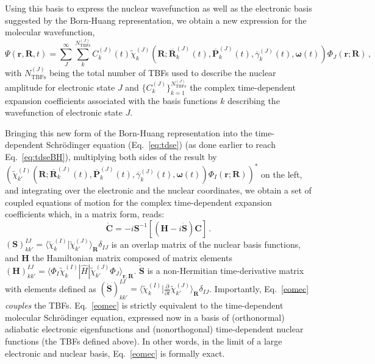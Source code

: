 \documentclass[9pt,bestpractices,pubversion]{livecoms}
\newcommand{\bra}[1]{\langle #1|}
\newcommand{\ket}[1]{|#1\rangle}
\newcommand{\braket}[2]{\langle #1|#2\rangle}
\newcommand{\bs}{\mathbf}
\begin{document}
Using this basis to express the nuclear wavefunction as well as the electronic basis suggested by the Born-Huang representation, we obtain a new expression for the molecular wavefunction,
\begin{equation}
\Psi(\bs r,\bs R,t)=\sum_J^\infty \sum_k^{N_{\text{TBFs}}^{(J)}} C_k^{(J)}(t) \tilde{\chi}_k^{(J)}\left(\bs R;\overline{\bs R}_k^{(J)}(t),\overline{\bs P}_k^{(J)}(t),\overline{\gamma}_k^{(J)}(t),\boldsymbol{\omega}(t)\right) \Phi_J(\bs r;\bs R) \, ,
\label{wfbasis}
\end{equation}
with $N_{\text{TBFs}}^{(J)}$ being the total number of TBFs used to describe the nuclear amplitude for electronic state $J$ and $\{C_k^{(J)}\}_{k=1}^{N_{\text{TBFs}}^{(J)}}$ the complex time-dependent expansion coefficients associated with the basis functions $k$ describing the wavefunction of electronic state $J$.

Bringing this new form of the Born-Huang representation into the time-dependent Schr\"{o}dinger equation (Eq.~\eqref{eq:tdse}) (as done earlier to reach Eq.~\eqref{eq:tdseBH}), multiplying both sides of the result by $\left(\tilde{\chi}_{k'}^{(I)}(\bs R;\overline{\bs R}_k^{(J)}(t),\overline{\bs P}_k^{(J)}(t),\overline{\gamma}_k^{(J)}(t),\boldsymbol{\omega}(t)) \Phi_I(\bs r;\bs R)\right)^*$ on the left, and integrating over the electronic and the nuclear coordinates, we obtain a set of coupled equations of motion for the complex time-dependent expansion coefficients which, in a matrix form, reads:
\begin{equation}
\dot{\bs C}=-i\bs S^{-1}[(\bs H - i \dot{\bs S})\bs C] \, .
\label{eomec}
\end{equation}
$(\bs S)_{kk'}^{IJ}=\braket{\tilde{\chi}_k^{(I)}}{\tilde{\chi}_{k'}^{(J)}}_{\bs R}\delta_{IJ}$ is an overlap matrix of the nuclear basis functions, and $\bs H$ the Hamiltonian matrix composed of matrix elements $(\bs H)_{kk'}^{IJ}=\bra{\Phi_I\tilde{\chi}_k^{(I)}}\hat{H}\ket{\tilde{\chi}_{k'}^{(J)}\Phi_J}_{\bs r,\bs R}$. $\dot{\bs S}$ is a non-Hermitian time-derivative matrix with elements defined as $(\dot{\bs S})_{kk'}^{IJ}=\braket{\tilde{\chi}_k^{(I)}}{\frac{\partial}{\partial t}\tilde{\chi}_{k'}^{(J)}}_{\bs R}\delta_{IJ}$. Importantly, Eq.~\ref{eomec} \textit{couples} the TBFs.
Eq.~\eqref{eomec} is strictly equivalent to the time-dependent molecular Schr\"odinger equation, expressed now in a basis of (orthonormal) adiabatic electronic eigenfunctions and (nonorthogonal) time-dependent nuclear functions (the TBFs defined above). In other words, in the limit of a large electronic and nuclear basis,  Eq.~\eqref{eomec} is formally exact. 
\end{document}
